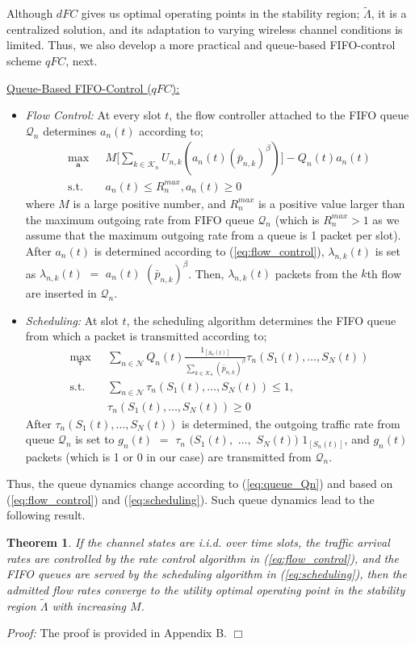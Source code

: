 \documentclass[conference]{IEEEtran}
\newtheorem{theorem}{Theorem}
\newcommand{\Kset}{\mathcal{K}}
\newcommand{\Nset}{\mathcal{N}}
\newcommand{\Qset}{\mathcal{Q}}
\begin{document}
Although $dFC$ gives us optimal operating points in the stability region; $\tilde{\Lambda}$, it is a centralized solution, and its adaptation to varying wireless channel conditions is limited. Thus, we also develop a more practical and queue-based FIFO-control scheme $qFC$, next. 

\underline{Queue-Based FIFO-Control ($qFC$):}
\begin{itemize} 
\item {\em Flow Control:} At every slot $t$, the flow controller attached to the FIFO queue $\Qset_{n}$ determines $a_n(t)$ according to; 
\begin{align} \label{eq:flow_control}
\max_{\boldsymbol a} \mbox{ } &  M  \bigl[\sum_{k \in \Kset_{n}} U_{n,k}(a_{n}(t) (\bar{p}_{n,k})^{\beta}) \bigr] - Q_{n}(t)a_{n}(t) \nonumber \\
\mbox{s.t.} \mbox{ }  &  a_n(t) \leq R_{n}^{max}, a_n(t) \geq 0 
\end{align} where $M$ is a large positive number, and $R_{n}^{max}$ is a positive value larger than the maximum outgoing rate from FIFO queue $\Qset_n$ (which is $R_{n}^{max} > 1$ as we assume that the maximum outgoing rate from a queue is 1 packet per slot). After $a_n(t)$ is determined according to (\ref{eq:flow_control}), $\lambda_{n,k}(t)$ is set as $\lambda_{n,k}(t)$ $=$ $a_{n}(t)$ $(\bar{p}_{n,k})^{\beta}$. Then, $\lambda_{n,k}(t)$ packets from the $k$th flow are inserted in $\Qset_{n}$. 
\item {\em Scheduling:} At slot $t$, the scheduling algorithm determines the FIFO queue from which a packet is transmitted according to;
\begin{align} \label{eq:scheduling}
\max_{\boldsymbol \tau} \mbox{ } &  \sum_{n \in \Nset} Q_{n}(t) \frac{1_{[S_{n}(t)]}}{\sum_{k \in \Kset_{n} } (\bar{p}_{n,k})^{\beta} }   \tau_{n}(S_1(t), \ldots, S_N(t)) \nonumber \\
\mbox{s.t.} \mbox{ }  &  \sum_{n \in \Nset} \tau_{n} (S_1(t), \ldots, S_N(t)) \leq 1, \nonumber \\
& \tau_{n} (S_1(t), \ldots, S_N(t)) \geq 0
\end{align} After $\tau_{n} (S_1(t), \ldots, S_N(t)) $ is determined, the outgoing traffic rate from queue $\Qset_{n}$ is set to $g_{n}(t)$ $=$ $\tau_{n}$ $(S_1(t),$ $\ldots,$ $S_N(t))$ $1_{[S_{n}(t)]}$, and $g_{n}(t)$ packets (which is 1 or 0 in our case) are transmitted from $\Qset_{n}$. 
\end{itemize}

Thus, the queue dynamics change according to (\ref{eq:queue_Qn}) and based on (\ref{eq:flow_control}) and (\ref{eq:scheduling}). Such queue dynamics lead to the following result. 
\begin{theorem} \label{theorem_lyap}
If the channel states are i.i.d. over time slots, the traffic arrival rates are controlled by the rate control algorithm in (\ref{eq:flow_control}), and the FIFO queues are served by the scheduling algorithm in (\ref{eq:scheduling}), then the admitted flow rates converge to the utility optimal operating point in the stability region $\tilde{\Lambda}$ with increasing $M$.
\end{theorem}
{\em Proof:} The proof is provided in Appendix B.
\hfill $\Box$
\end{document}
